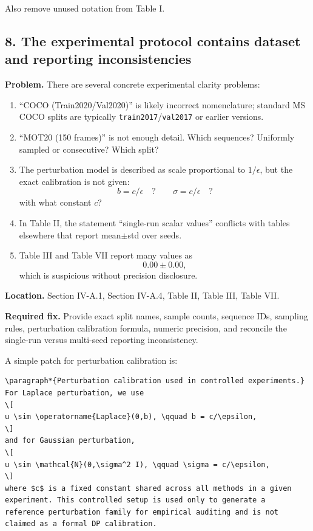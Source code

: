 Also remove unused notation from Table I.

\subsection*{8. The experimental protocol contains dataset and reporting inconsistencies}

\textbf{Problem.}  
There are several concrete experimental clarity problems:

\begin{enumerate}
\item ``COCO (Train2020/Val2020)'' is likely incorrect nomenclature; standard MS COCO splits are typically \texttt{train2017}/\texttt{val2017} or earlier versions.
\item ``MOT20 (150 frames)'' is not enough detail. Which sequences? Uniformly sampled or consecutive? Which split?
\item The perturbation model is described as scale proportional to $1/\epsilon$, but the exact calibration is not given:
\[
b = c/\epsilon \quad ?
\qquad
\sigma = c/\epsilon \quad ?
\]
with what constant $c$?
\item In Table II, the statement ``single-run scalar values'' conflicts with tables elsewhere that report mean$\pm$std over seeds.
\item Table III and Table VII report many values as
\[
0.00 \pm 0.00,
\]
which is suspicious without precision disclosure.
\end{enumerate}

\textbf{Location.}  
Section IV-A.1, Section IV-A.4, Table II, Table III, Table VII.

\textbf{Required fix.}  
Provide exact split names, sample counts, sequence IDs, sampling rules, perturbation calibration formula, numeric precision, and reconcile the single-run versus multi-seed reporting inconsistency.

A simple patch for perturbation calibration is:

\begin{verbatim}
\paragraph*{Perturbation calibration used in controlled experiments.}
For Laplace perturbation, we use
\[
u \sim \operatorname{Laplace}(0,b), \qquad b = c/\epsilon,
\]
and for Gaussian perturbation,
\[
u \sim \mathcal{N}(0,\sigma^2 I), \qquad \sigma = c/\epsilon,
\]
where $c$ is a fixed constant shared across all methods in a given
experiment. This controlled setup is used only to generate a
reference perturbation family for empirical auditing and is not
claimed as a formal DP calibration.
\end{verbatim}

